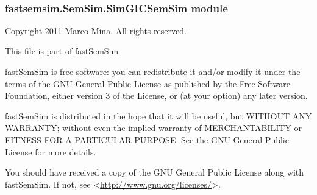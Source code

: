\documentclass[letterpaper,10pt,english]{sphinxmanual}
\begin{document}
\begin{fulllineitems}
\label{fastsemsim.SemSim:fastsemsim.SemSim.SetSemSim.SetSemSim}~

\begin{fulllineitems}
\label{fastsemsim.SemSim:fastsemsim.SemSim.SetSemSim.SetSemSim.SemSim}
\end{fulllineitems}


\end{fulllineitems}



\subsubsection{fastsemsim.SemSim.SimGICSemSim module}
\label{fastsemsim.SemSim:module-fastsemsim.SemSim.SimGICSemSim}\label{fastsemsim.SemSim:fastsemsim-semsim-simgicsemsim-module}
Copyright 2011 Marco Mina. All rights reserved.

This file is part of fastSemSim

fastSemSim is free software: you can redistribute it and/or modify
it under the terms of the GNU General Public License as published by
the Free Software Foundation, either version 3 of the License, or
(at your option) any later version.

fastSemSim is distributed in the hope that it will be useful,
but WITHOUT ANY WARRANTY; without even the implied warranty of
MERCHANTABILITY or FITNESS FOR A PARTICULAR PURPOSE.  See the
GNU General Public License for more details.

You should have received a copy of the GNU General Public License
along with fastSemSim.  If not, see \textless{}\href{http://www.gnu.org/licenses/}{http://www.gnu.org/licenses/}\textgreater{}.
\end{document}
